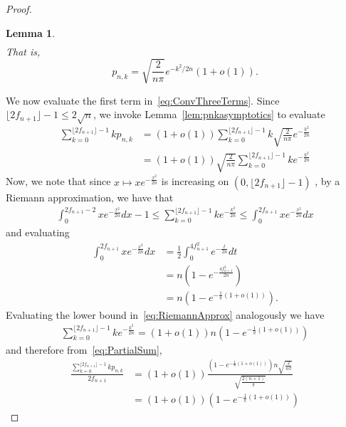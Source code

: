 \documentclass[twoside]{article}
\newtheorem{lemma}{Lemma}
\begin{document}
\begin{proof}
\begin{lemma}
\begin{align}
        \end{align}
        That is,
        \[
        p_{n,k} = \sqrt{\frac{2}{n\pi}}e^{-k^2/2n} (1+o(1)).
        \]
    \end{lemma}
    We now evaluate the first term in~\eqref{eq:ConvThreeTerms}. Since $\lfloor 2f_{n+1} \rfloor - 1 \le 2\sqrt{n}$, we invoke Lemma~\ref{lem:pnkasymptotics} to evaluate 
    \begin{align}
        \sum_{k=0}^{\lfloor 2f_{n+1} \rfloor-1} kp_{n,k} &=    (1+o(1))\sum_{k=0}^{\lfloor 2f_{n+1} \rfloor-1} k \sqrt{\frac{2}{n\pi}} e^{-\frac{k^2}{2n}} \\
        &= (1+o(1)) \sqrt{\frac{2}{n\pi}} \sum_{k=0}^{\lfloor 2f_{n+1} \rfloor-1} k e^{-\frac{k^2}{2n}} \label{eq:PartialSum}
    \end{align}
    Now, we note that since $x \mapsto xe^{-\frac{x^2}{2n}}$ is increasing on $(0,\lfloor 2f_{n+1} \rfloor-1)$ %
    , by a Riemann approximation, we have that 
    \begin{align} \label{eq:RiemannApprox}
    \int_{0}^{2f_{n+1}-2} x e^{-\frac{x^2}{2n}} dx - 1 \le\sum_{k=0}^{\lfloor 2f_{n+1} \rfloor-1} k e^{-\frac{k^2}{2n}} \le \int_{0}^{2f_{n+1}} x e^{-\frac{x^2}{2n}} dx 
    \end{align}
    and evaluating
    \begin{align}
        \int_{0}^{2f_{n+1}} x e^{-\frac{x^2}{2n}} dx &= \frac{1}{2} \int_{0}^{4f_{n+1}^2} e^{-\frac{t}{2n}} dt \nonumber\\
        &= n\left(1-e^{-\frac{4f_{n+1}^2}{2n}}\right) \nonumber\\
        &= n\left(1-e^{-\frac{1}{\pi}(1+o(1))}\right).
    \end{align}
    Evaluating the lower bound in~\eqref{eq:RiemannApprox} analogously we have 
    \begin{align}\label{eq:ExptZCLowRegime}
        \sum_{k=0}^{\lfloor 2f_{n+1} \rfloor-1} k e^{-\frac{k^2}{2n}} = (1+o(1)) n\left(1-e^{-\frac{1}{\pi}(1+o(1))}\right)
    \end{align}
    and therefore from~\eqref{eq:PartialSum}, 
    \begin{align}
        \frac{\sum_{k=0}^{\lfloor 2f_{n+1} \rfloor-1} k p_{n,k}}{2f_{n+1}} &= (1+o(1))\frac{\left(1-e^{-\frac{1}{\pi}(1+o(1))}\right) n \sqrt{\frac{2}{n \pi}}}{\sqrt{\frac{2(n+1)}{\pi}}} \nonumber\\
      &= (1+o(1))\left(1-e^{-\frac{1}{\pi}(1+o(1))}\right) \label{eq:LittleOPartialSum}
    \end{align}

\end{proof}
\end{document}
